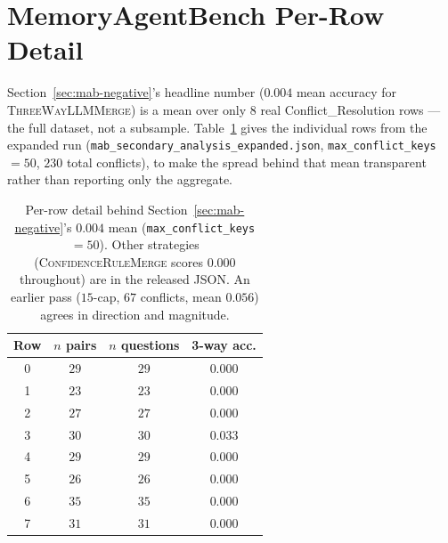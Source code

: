 \documentclass[11pt]{article}
\begin{document}
\begin{table}[t]
\centering
\small
{}
\caption{Accuracy by divergence span and strategy ($20$ scenarios/span).
Descriptive; span was not a preregistered factor.}
\label{tab:per-span}
\end{table}

\section{MemoryAgentBench Per-Row Detail}
\label{sec:mab-per-row}

Section~\ref{sec:mab-negative}'s headline number ($0.004$ mean accuracy for
\textsc{ThreeWayLLMMerge}) is a mean over only $8$ real Conflict\_Resolution
rows --- the full dataset, not a subsample. Table~\ref{tab:mab-per-row} gives
the individual rows from the expanded run
(\texttt{mab\_secondary\_analysis\_expanded.json}, \texttt{max\_conflict\_keys}${=}50$,
$230$ total conflicts), to make the spread behind that mean transparent
rather than reporting only the aggregate.

\begin{table}[t]
\centering
\small
\begin{tabular}{cccc}
\toprule
\textbf{Row} & \textbf{$n$ pairs} & \textbf{$n$ questions} & \textbf{3-way acc.} \\
\midrule
0 & $29$ & $29$ & $0.000$ \\
1 & $23$ & $23$ & $0.000$ \\
2 & $27$ & $27$ & $0.000$ \\
3 & $30$ & $30$ & $0.033$ \\
4 & $29$ & $29$ & $0.000$ \\
5 & $26$ & $26$ & $0.000$ \\
6 & $35$ & $35$ & $0.000$ \\
7 & $31$ & $31$ & $0.000$ \\
\bottomrule
\end{tabular}
\caption{Per-row detail behind Section~\ref{sec:mab-negative}'s $0.004$ mean
(\texttt{max\_conflict\_keys}${=}50$). Other strategies
(\textsc{ConfidenceRuleMerge} scores $0.000$ throughout) are in the released
JSON. An earlier pass ($15$-cap, $67$ conflicts, mean $0.056$) agrees in
direction and magnitude.}
\label{tab:mab-per-row}
\end{table}
\end{document}
